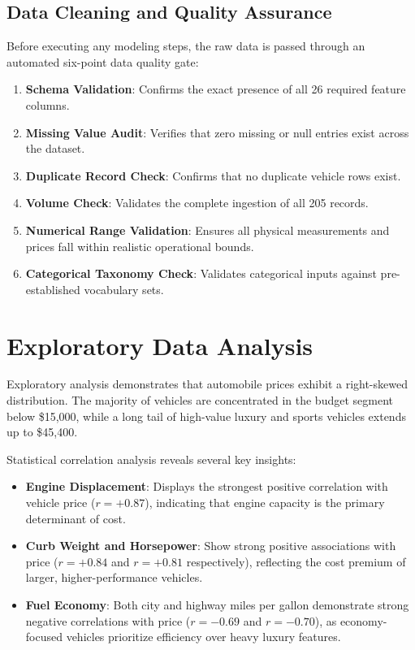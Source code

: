 \documentclass[conference]{IEEEtran}
\begin{document}
\subsection{Data Cleaning and Quality Assurance}
Before executing any modeling steps, the raw data is passed through an automated six-point data quality gate:
\begin{enumerate}
    \item \textbf{Schema Validation}: Confirms the exact presence of all 26 required feature columns.
    \item \textbf{Missing Value Audit}: Verifies that zero missing or null entries exist across the dataset.
    \item \textbf{Duplicate Record Check}: Confirms that no duplicate vehicle rows exist.
    \item \textbf{Volume Check}: Validates the complete ingestion of all 205 records.
    \item \textbf{Numerical Range Validation}: Ensures all physical measurements and prices fall within realistic operational bounds.
    \item \textbf{Categorical Taxonomy Check}: Validates categorical inputs against pre-established vocabulary sets.
\end{enumerate}

\section{Exploratory Data Analysis}
Exploratory analysis demonstrates that automobile prices exhibit a right-skewed distribution. The majority of vehicles are concentrated in the budget segment below \$15,000, while a long tail of high-value luxury and sports vehicles extends up to \$45,400.

Statistical correlation analysis reveals several key insights:
\begin{itemize}
    \item \textbf{Engine Displacement}: Displays the strongest positive correlation with vehicle price ($r = +0.87$), indicating that engine capacity is the primary determinant of cost.
    \item \textbf{Curb Weight and Horsepower}: Show strong positive associations with price ($r = +0.84$ and $r = +0.81$ respectively), reflecting the cost premium of larger, higher-performance vehicles.
    \item \textbf{Fuel Economy}: Both city and highway miles per gallon demonstrate strong negative correlations with price ($r = -0.69$ and $r = -0.70$), as economy-focused vehicles prioritize efficiency over heavy luxury features.
\end{itemize}
\end{document}
